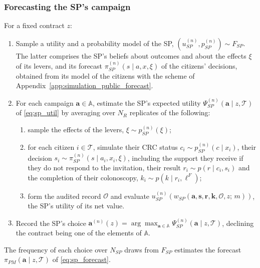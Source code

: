 \documentclass[12pt]{article}
\begin{document}
\subsubsection{Forecasting the SP's campaign}\label{app:simulation_OBP_incentive}
For a fixed contract $z$:
\begin{enumerate}
  \item Sample a utility and a probability model of the SP, $(u^{(n)}_{SP}, p^{(n)}_{SP}) \sim F_{SP}$. The latter comprises the SP's beliefs about outcomes and about the effects $\xi$ of its levers, and its forecast $\pi^{(n)}_{SP}(s \mid a, x, \xi)$ of the citizens' decisions, obtained from its model of the citizens with the scheme of Appendix~\ref{app:simulation_public_forecast}.
  \item For each campaign $\mathbf{a} \in \mathbb{A}$, estimate the SP's expected utility $\Psi^{(n)}_{SP}(\mathbf{a} \mid z, \mathcal{T})$ of \eqref{eq:sp_util} by averaging over $N_R$ replicates of the following:
  \begin{enumerate}
    \item sample the effects of the levers, $\xi \sim p^{(n)}_{SP}(\xi)$;
    \item for each citizen $i \in \mathcal{T}$, simulate their CRC status $c_i \sim p^{(n)}_{SP}(c \mid x_i)$, their decision $s_i \sim \pi^{(n)}_{SP}(s \mid a_i, x_i, \xi)$, including the support they receive if they do not respond to the invitation, their result $r_i \sim p(r \mid c_i, s_i)$ and the completion of their colonoscopy, $k_i \sim p(k \mid r_i, \ell^F)$;
    \item form the audited record $\mathcal{O}$ and evaluate $u^{(n)}_{SP}(w_{SP}(\mathbf{a}, \mathbf{s}, \mathbf{r}, \mathbf{k}, \mathcal{O}, z;\, m))$, the SP's utility of its net value.
  \end{enumerate}
  \item Record the SP's choice $\mathbf{a}^{(n)}(z) = \arg\max_{\mathbf{a} \in \mathbb{A}} \Psi^{(n)}_{SP}(\mathbf{a} \mid z, \mathcal{T})$, declining the contract being one of the elements of $\mathbb{A}$.
\end{enumerate}
The frequency of each choice over $N_{SP}$ draws from $F_{SP}$ estimates the forecast $\pi_{PM}(\mathbf{a} \mid z, \mathcal{T})$ of \eqref{eq:sp_forecast}.
\end{document}
